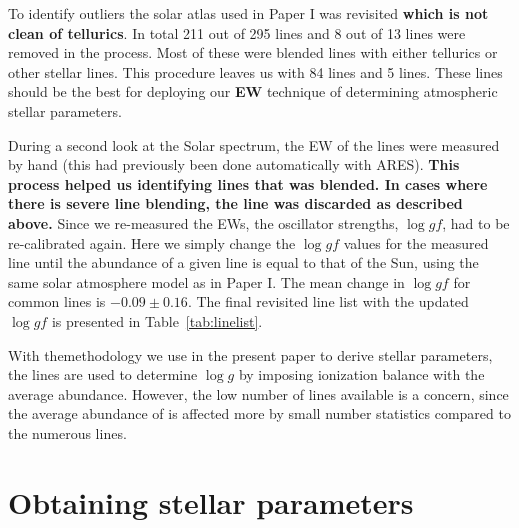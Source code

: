 \documentclass{aa}
\begin{document}
To identify outliers the solar atlas used in Paper I was revisited {\bf which is not clean of
tellurics}. In total 211 out of 295  lines and 8 out of 13  lines were
removed in the process. Most of these were blended lines with either tellurics or other stellar
lines. This procedure leaves us with 84  lines and 5  lines. These lines
should be the best for deploying our {\bf EW} technique of determining atmospheric stellar
parameters.

During a second look at the Solar spectrum, the EW of the lines were measured by hand (this had
previously been done automatically with ARES). {\bf This process helped us identifying lines that
was blended. In cases where there is severe line blending, the line was discarded as described
above.} Since we re-measured the EWs, the oscillator strengths, $\log \mathit{gf}$, had to be
re-calibrated again. Here we simply change the $\log \mathit{gf}$ values for the measured line until
the abundance of a given line is equal to that of the Sun, using the same solar atmosphere model as
in Paper I. The mean change in $\log \mathit{gf}$ for common lines is $-0.09 \pm 0.16$. The final
revisited line list with the updated $\log \mathit{gf}$ is presented in Table~\ref{tab:linelist}.

With themethodology we use in the present paper to derive stellar parameters, the  lines
are used to determine $\log g$ by imposing ionization balance with the average 
abundance. However, the low number of  lines available is a concern, since the average
abundance of  is affected more by small number statistics compared to the numerous
 lines.


\section{Obtaining stellar parameters}
\label{sec:method}
\end{document}
